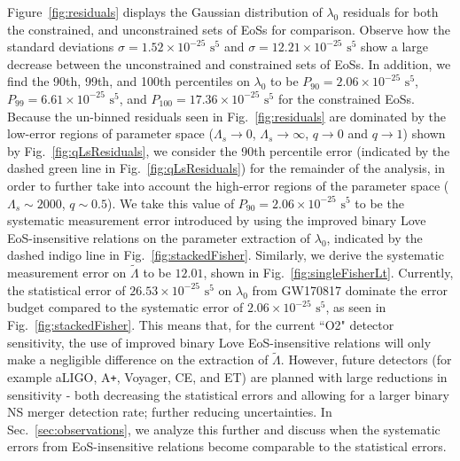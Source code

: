 \documentclass[prd,twocolumn,nofootinbib,superscriptaddress,amsmath,amssymb]{revtex4-1}
\begin{document}
Figure~\ref{fig:residuals} displays the Gaussian distribution of $\lambda_0$ residuals for both the constrained, and unconstrained sets of EoSs for comparison.
Observe how the standard deviations $\sigma=1.52\times10^{-25} \text{ s}^5$ and $\sigma=12.21\times10^{-25} \text{ s}^5$ show a large decrease between the unconstrained and constrained sets of EoSs.
In addition, we find the 90th, 99th, and 100th percentiles on $\lambda_0$ to be $P_{90}=2.06\times10^{-25} \text{ s}^5$, $P_{99}=6.61\times10^{-25} \text{ s}^5$, and $P_{100}=17.36\times10^{-25} \text{ s}^5$ for the constrained EoSs.
Because the un-binned residuals seen in Fig.~\ref{fig:residuals} are dominated by the low-error regions of parameter space ($\Lambda_s \rightarrow 0$, $\Lambda_s \rightarrow \infty$, $q \rightarrow 0$ and $q \rightarrow 1$) shown by Fig.~\ref{fig:qLsResiduals}, we consider the 90th percentile error (indicated by the dashed green line in Fig.~\ref{fig:qLsResiduals}) for the remainder of the analysis, in order to further take into account the high-error regions of the parameter space ($\Lambda_s \sim 2000$, $q\sim0.5$).
We take this value of $P_{90}=2.06\times10^{-25} \text{ s}^5$ to be the systematic measurement error introduced by using the improved binary Love EoS-insensitive relations on the parameter extraction of $\lambda_0$, indicated by the dashed indigo line in Fig.~\ref{fig:stackedFisher}.
Similarly, we derive the systematic measurement error on $\tilde\Lambda$ to be $12.01$, shown in Fig.~\ref{fig:singleFisherLt}.
Currently, the statistical error of $26.53 \times 10^{-25} \text{ s}^5$ on $\lambda_0$ from GW170817 dominate the error budget compared to the systematic error of $2.06\times10^{-25} \text{ s}^5$, as seen in Fig.~\ref{fig:stackedFisher}.
This means that, for the current ``O2" detector sensitivity, the use of improved binary Love EoS-insensitive relations will only make a negligible difference on the extraction of $\tilde\Lambda$.
However, future detectors (for example aLIGO, A\texttt{+}, Voyager, CE, and ET) are planned with large reductions in sensitivity - both decreasing the statistical errors and allowing for a larger binary NS merger detection rate; further reducing uncertainties.
In Sec.~\ref{sec:observations}, we analyze this further and discuss when the systematic errors from EoS-insensitive relations become comparable to the statistical errors.
\end{document}
